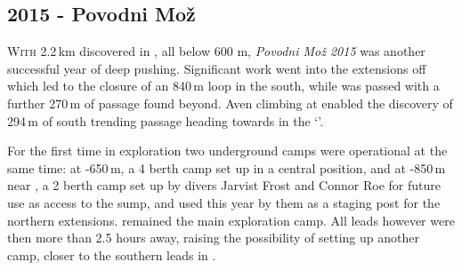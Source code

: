 \newpage
\begin{tcolorbox}
\chapter{2015 - Povodni Mo\v{z}}
		\lettrine{W}{ith} 2.2\,km discovered in , all below 600 m, \emph{Povodni Mo\v{z} 2015} was another successful year of deep pushing. Significant work went into the extensions off  which led to the closure of an 840\,m loop in the south, while  was passed with a further 270\,m of passage found beyond. Aven climbing at  enabled the discovery of 294\,m of south trending passage heading towards  in the `'. 

		For the first time in  exploration two underground camps were operational at the same time: at -650\,m, a 4 berth camp set up in a central position, and  at -850\,m near , a 2 berth camp set up by divers Jarvist Frost and Connor Roe for future use as access to the  sump, and used this year by them as a staging post for the northern extensions.  remained the main exploration camp. All leads however were then more than 2.5 hours away, raising the possibility of setting up another camp, closer to the southern leads in .
	

\end{tcolorbox}
\BgThispage



